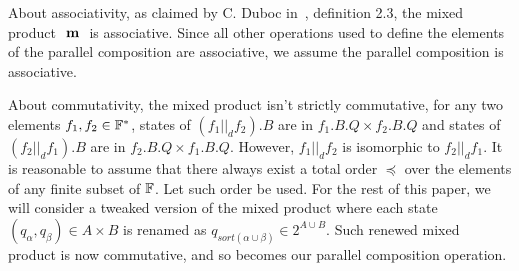 \documentclass[runningheads]{llncs}
\newcommand{\noteag}[1]{\notemar{ag}{#1}}
\newcommand{\mprod}{\text{ \textbf{m} }}
\begin{document}
\begin{remark}
    About associativity, as claimed by C. Duboc in~\cite{duboc_mixed_1986}, definition 2.3, the mixed product $\mprod$ is associative. Since all other operations used to define the elements of the parallel composition are associative, we assume the parallel composition is associative.
    
\end{remark}

\begin{remark}
    About commutativity, the mixed product isn't strictly commutative, for any two elements $f_1,f_2 \in \mathbb{F}^*$, states of $(f_1 ||_d f_2).B$ are in $f_1.B.Q \times f_2.B.Q$ and states of $(f_2 ||_d f_1).B$ are in $f_2.B.Q \times f_1.B.Q$. However, $f_1 ||_d f_2$ is isomorphic to $f_2 ||_d f_1$.
    It is reasonable to assume that there always exist a total order $\preccurlyeq$ over the elements of any finite subset of $\mathbb{F}$.
    Let such order be used. For the rest of this paper, we will consider a tweaked version of the mixed product where each state $(q_\alpha,q_\beta) \in A \times B$ is renamed as $q_{sort(\alpha\cup\beta)} \in 2^{A\cup B}$. Such renewed mixed product is now commutative, and so becomes our parallel composition operation.
\end{remark}
\end{document}
